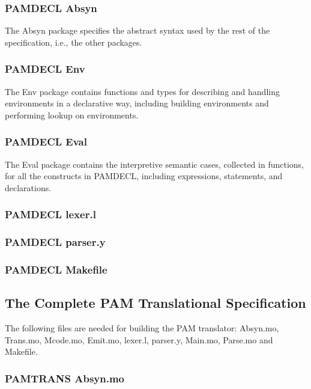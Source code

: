 \documentclass[10pt,a4]{article}
\begin{document}
\subsubsection*{PAMDECL Absyn}
The Absyn package specifies the abstract syntax used by the rest of the specification, i.e., the other packages.


\subsubsection*{PAMDECL Env}
The Env package contains functions and types for describing and handling environments in a declarative way, including building environments and performing lookup on environments.


\subsubsection*{PAMDECL Eval}
The Eval package contains the interpretive semantic cases, collected in functions, for all the constructs in PAMDECL, including expressions, statements, and declarations.


\lstset{language=}
\subsubsection*{PAMDECL lexer.l}


\subsubsection*{PAMDECL parser.y}

\lstset{language=modelica}

\subsubsection*{PAMDECL Makefile}


\subsection*{The Complete PAM Translational Specification}
The following files are needed for building the PAM translator: Absyn.mo, Trans.mo, Mcode.mo, Emit.mo, lexer.l, parser.y, Main.mo, Parse.mo and Makefile.

\subsubsection*{PAMTRANS Absyn.mo}

\end{document}
